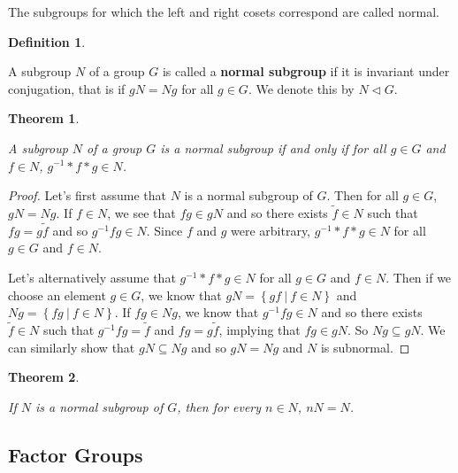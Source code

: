 \documentclass[
]{book}
\newtheorem{theorem}{Theorem}[chapter]
\theoremstyle{definition}
\newtheorem{definition}{Definition}[chapter]
\theoremstyle{definition}
\theoremstyle{definition}
\theoremstyle{definition}
\theoremstyle{remark}
\begin{document}
The subgroups for which the left and right cosets correspond are called normal.

\begin{definition}
\protect\hypertarget{def:unlabeled-div-220}{}\label{def:unlabeled-div-220}

A subgroup \(N\) of a group \(G\) is called a \textbf{normal subgroup} if it is invariant under conjugation, that is if \(gN = Ng\) for all \(g\in G\). We denote this by \(N \vartriangleleft G\).

\end{definition}

\begin{theorem}
\protect\hypertarget{thm:unlabeled-div-221}{}\label{thm:unlabeled-div-221}

A subgroup \(N\) of a group \(G\) is a normal subgroup if and only if for all \(g\in G\) and \(f\in N\), \(g^{-1}*f*g \in N\).

\end{theorem}

\begin{proof}

Let's first assume that \(N\) is a normal subgroup of \(G\). Then for all \(g\in G\), \(gN=Ng\). If \(f\in N\), we see that \(fg\in gN\) and so there exists \(\tilde{f}\in N\) such that \(fg=g\tilde{f}\) and so \(g^{-1}fg \in N\). Since \(f\) and \(g\) were arbitrary, \(g^{-1}*f*g \in N\) for all \(g\in G\) and \(f\in N\).

Let's alternatively assume that \(g^{-1}*f*g \in N\) for all \(g\in G\) and \(f\in N\). Then if we choose an element \(g\in G\), we know that \(gN = \left\{ g f \: \vert \: f\in N\right\}\) and \(Ng=\left\{ fg \: \vert \: f\in N\right\}\). If \(fg\in Ng\), we know that \(g^{-1} fg \in N\) and so there exists \(\tilde{f}\in N\) such that \(g^{-1}fg=\tilde{f}\) and \(fg=g\tilde{f}\), implying that \(fg\in gN\). So \(Ng\subseteq gN\). We can similarly show that \(gN\subseteq Ng\) and so \(gN=Ng\) and \(N\) is subnormal.

\end{proof}

\begin{theorem}
\protect\hypertarget{thm:unlabeled-div-223}{}\label{thm:unlabeled-div-223}

If \(N\) is a normal subgroup of \(G\), then for every \(n\in N\), \(nN=N\).

\end{theorem}

\hypertarget{factor-groups}{%
\subsection{Factor Groups}\label{factor-groups}}
\end{document}
